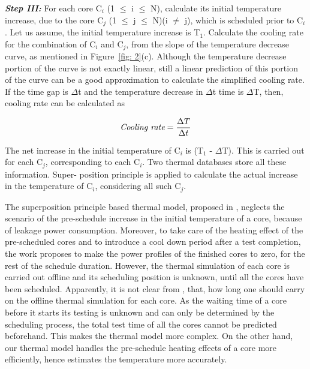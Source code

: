\documentclass[conference]{IEEEtran}
\begin{document}
	\par
	\textbf{\textit{Step III:}} For each core C$_{i}$ (1 $\leq$ i $\leq$ N), calculate its initial
temperature increase, due to the core C$_{j}$ (1 $\leq$ j $\leq$ N)(i $\neq$
j), which is scheduled prior to C$_{i}$. Let us assume, the initial
temperature increase is T$_{1}$. Calculate the cooling rate for the
combination of C$_{i}$ and C$_{j}$, from the slope of the temperature
decrease curve, as mentioned in Figure~\ref{fig: 2}(c). Although the
temperature decrease portion of the curve is not exactly linear,
still a linear prediction of this portion of the curve can be a
good approximation to calculate the simplified cooling rate. If
the time gap is $\Delta$t and the temperature decrease in $\Delta$t time
is $\Delta$T, then, cooling rate can be calculated as

\begin{equation}
\textit{Cooling rate} = \frac{\Delta T}{\Delta t}\\
\end{equation}
 

    \par
	The net increase in the initial temperature of C$_{i}$ is (T$_{1}$ - $\Delta$T). This is carried out for each C$_{j}$, corresponding to each
C$_{i}$. Two thermal databases store all these information. Super-
position principle is applied to calculate the actual increase in
the temperature of C$_{i}$, considering all such C$_{j}$.\\

	\par
	The superposition principle based thermal model, proposed
in \cite{yao2011power}, neglects the scenario of the pre-schedule increase in
the initial temperature of a core, because of leakage power
consumption. Moreover, to take care of the heating effect of
the pre-scheduled cores and to introduce a cool down period
after a test completion, the work \cite{yao2011power} proposes to make the
power profiles of the finished cores to zero, for the rest of
the schedule duration. However, the thermal simulation of
each core is carried out offline and its scheduling position is
unknown, until all the cores have been scheduled. Apparently,
it is not clear from \cite{yao2011power}, that, how long one should carry on the
offline thermal simulation for each core. As the waiting time
of a core before it starts its testing is unknown and can only
be determined by the scheduling process, the total test time of
all the cores cannot be predicted beforehand. This makes the
thermal model more complex. On the other hand, our thermal
model handles the pre-schedule heating effects of a core more
efficiently, hence estimates the temperature more accurately.\\
\end{document}
